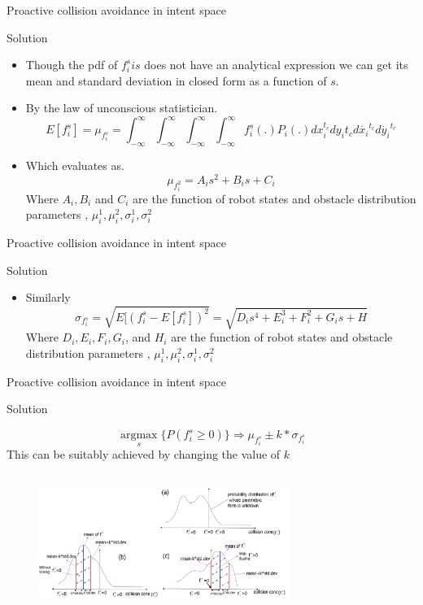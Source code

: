 \documentclass{beamer}
\begin{document}
\begin{frame}{Proactive collision avoidance in intent space}


\begin{block}{Solution}
\begin{itemize}


\item{Though the pdf of $f_i^s is$ does not have an analytical expression we can get its mean and standard deviation in closed form as a function of $s$.}
\item{By the law of unconscious statistician.}
$$E[f_i^s]=\mu_{f_i^s}=\int_{-\infty}^{\infty}\int_{-\infty}^{\infty}\int_{-\infty}^{\infty}
\int_{-\infty}^{\infty}f_i^s(.)P_i(.)dx_i^{t_c}dy_i{t_c}d\dot{x_i}^{t_c}d\dot{y_i}^{t_c}$$
\item{Which evaluates as.}
$$\mu_{f_i^2} = A_is^2+B_is+C_i$$
Where $A_i,B_i$ and $C_i$ are the function of robot states and obstacle distribution parameters , $\mu_i^1,\mu_i^2,\sigma_i^1,\sigma_i^2$
 \end{itemize} 
\end{block}
\end{frame}
\begin{frame}{Proactive collision avoidance in intent space}


\begin{block}{Solution}
\begin{itemize}


\item{Similarly}
$$ \sigma_{f_i^s} = \sqrt{E[(f_i^s - E[f_i^s])^2} = 
\sqrt{D_is^4+E_i^3+F_i^2+G_is+H}$$
Where $D_i,E_i,F_i,G_i$, and $H_i$ are the function of robot states and obstacle distribution parameters , $\mu_i^1,\mu_i^2,\sigma_i^1,\sigma_i^2$
 \end{itemize} 
\end{block}
\end{frame}
\begin{frame}{Proactive collision avoidance in intent space}
\begin{block}{Solution}

$$\underset{s}{\operatorname{argmax}}\{P(f_i^s \geq 0)\} \Longrightarrow \mu_{f_i^s} \pm k * \sigma_{f_i^s} $$ 
This can be suitably achieved by changing the value of $k$
\begin{figure}
\includegraphics[width= 8.1cm, height=4.5cm]{coll_cone_distribution.eps}
\end{figure}
\end{block}
\end{frame}
\end{document}
